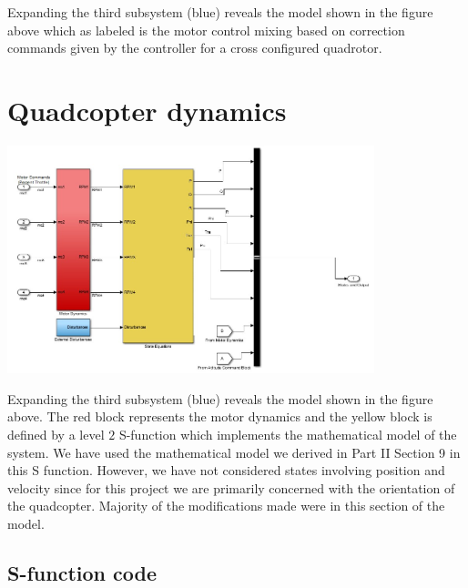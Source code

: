 \documentclass[9pt]{article}
\begin{document}
\noindent Expanding the third subsystem (blue) reveals the model shown in the figure above which as labeled is the motor control mixing based on correction commands given by the controller for a cross configured quadrotor.

\section{Quadcopter dynamics}

\begin{center}
\includegraphics[width=0.8\textwidth]{12.jpg}
\end{center}

\noindent Expanding the third subsystem (blue) reveals the model shown in the figure above. The red block represents the motor dynamics and the yellow block is defined by a level $2$ S-function which implements the mathematical model of the system. We have used the mathematical model we derived in Part II Section 9 in this S function. However, we have not considered states involving position and velocity since for this project we are primarily concerned with the orientation of the quadcopter. Majority of the modifications made were in this section of the model. 

\subsection{S-function code}
\end{document}
